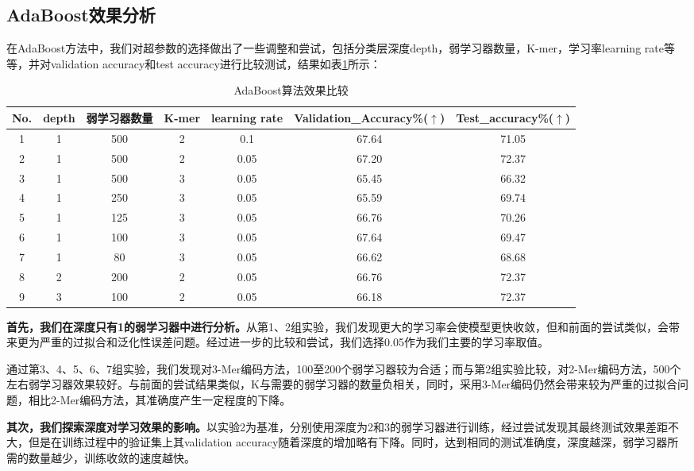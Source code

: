 \documentclass[a4paper,11pt,AutoFakeBold]{ctexart}
\begin{document}
\subsection{AdaBoost效果分析}

在AdaBoost方法中，我们对超参数的选择做出了一些调整和尝试，包括分类层深度depth，弱学习器数量，K-mer，学习率learning rate等等，并对validation accuracy和test accuracy进行比较测试，结果如表\ref{tab:AdaBoost算法效果比较}所示：

\begin{table}[h]
\centering
\footnotesize
\setlength{\tabcolsep}{5pt}
\caption{AdaBoost算法效果比较}
\label{tab:AdaBoost算法效果比较}
{
    \begin{tabular}{ccccccc}
    \toprule
    \textbf{No.} & \textbf{depth} & \textbf{弱学习器数量} & \textbf{K-mer} & \textbf{learning rate}  & \textbf{Validation\_Accuracy\%}($\uparrow$)  & \textbf{Test\_accuracy\%}($\uparrow$)
    \\
    \midrule
    1 & 1 & 500 & 2 & 0.1 & 67.64 & 71.05 \\
    2 & 1 & 500 & 2 & 0.05 & 67.20 & 72.37 \\
    3 & 1 & 500 & 3 & 0.05 & 65.45 & 66.32 \\
    4 & 1 & 250 & 3 & 0.05 & 65.59 & 69.74 \\
    5 & 1 & 125 & 3 & 0.05 & 66.76 & 70.26 \\
    6 & 1 & 100 & 3 & 0.05 & 67.64 & 69.47 \\
    7 & 1 & 80 & 3 & 0.05 & 66.62 & 68.68 \\
    8 & 2 & 200 & 2 & 0.05 & 66.76 & 72.37 \\
    9 & 3 & 100 & 2 & 0.05 & 66.18 & 72.37 \\
    \bottomrule
    \end{tabular}
}
\end{table}

\textbf{首先，我们在深度只有1的弱学习器中进行分析。}从第1、2组实验，我们发现更大的学习率会使模型更快收敛，但和前面的尝试类似，会带来更为严重的过拟合和泛化性误差问题。经过进一步的比较和尝试，我们选择0.05作为我们主要的学习率取值。

通过第3、4、5、6、7组实验，我们发现对3-Mer编码方法，100至200个弱学习器较为合适；而与第2组实验比较，对2-Mer编码方法，500个左右弱学习器效果较好。与前面的尝试结果类似，K与需要的弱学习器的数量负相关，同时，采用3-Mer编码仍然会带来较为严重的过拟合问题，相比2-Mer编码方法，其准确度产生一定程度的下降。

\textbf{其次，我们探索深度对学习效果的影响。}以实验2为基准，分别使用深度为2和3的弱学习器进行训练，经过尝试发现其最终测试效果差距不大，但是在训练过程中的验证集上其validation accuracy随着深度的增加略有下降。同时，达到相同的测试准确度，深度越深，弱学习器所需的数量越少，训练收敛的速度越快。
\end{document}
